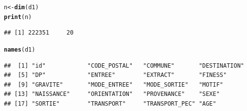 \documentclass[12pt,english,french,twoside]{report}\usepackage[]{graphicx}\usepackage[]{color}
\makeatletter
\newcommand{\hlkwd}[1]{\textcolor[rgb]{0.737,0.353,0.396}{\textbf{#1}}}%
\newenvironment{kframe}{%
 \def\at@end@of@kframe{}%
 \ifinner\ifhmode%
  \def\at@end@of@kframe{\end{minipage}}%
  \begin{minipage}{\columnwidth}%
 \fi\fi%
 \def\FrameCommand##1{\hskip\@totalleftmargin \hskip-\fboxsep
 \colorbox{shadecolor}{##1}\hskip-\fboxsep
     \hskip-\linewidth \hskip-\@totalleftmargin \hskip\columnwidth}%
 \MakeFramed {\advance\hsize-\width
   \@totalleftmargin\z@ \linewidth\hsize
   \@setminipage}}%
 {\par\unskip\endMakeFramed%
 \at@end@of@kframe}
\newenvironment{knitrout}{}{} %
\makeatother
\begin{document}
\begin{knitrout}
\color{fgcolor}\begin{kframe}
\begin{alltt}
n <- \hlkwd{dim}(d1)
\hlkwd{print}(n)
\end{alltt}
\begin{verbatim}
## [1] 222351     20
\end{verbatim}
\begin{alltt}
\hlkwd{names}(d1)
\end{alltt}
\begin{verbatim}
##  [1] "id"            "CODE_POSTAL"   "COMMUNE"       "DESTINATION"  
##  [5] "DP"            "ENTREE"        "EXTRACT"       "FINESS"       
##  [9] "GRAVITE"       "MODE_ENTREE"   "MODE_SORTIE"   "MOTIF"        
## [13] "NAISSANCE"     "ORIENTATION"   "PROVENANCE"    "SEXE"         
## [17] "SORTIE"        "TRANSPORT"     "TRANSPORT_PEC" "AGE"
\end{verbatim}
\end{kframe}
\end{knitrout}
\end{document}
